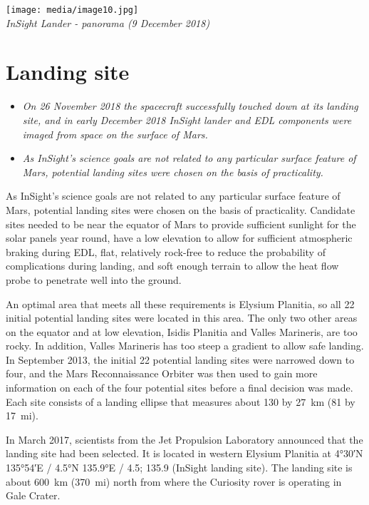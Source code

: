 \texttt{[image: media/image10.jpg]}\\
\emph{InSight Lander - panorama (9 December 2018)}

\section{Landing site}\label{landing-site}

\begin{itemize}
\item
  \emph{On 26 November 2018 the spacecraft successfully touched down at
  its landing site, and in early December 2018 InSight lander and EDL
  components were imaged from space on the surface of Mars.}
\item
  \emph{As InSight's science goals are not related to any particular
  surface feature of Mars, potential landing sites were chosen on the
  basis of practicality.}
\end{itemize}

As InSight's science goals are not related to any particular surface
feature of Mars, potential landing sites were chosen on the basis of
practicality. Candidate sites needed to be near the equator of Mars to
provide sufficient sunlight for the solar panels year round, have a low
elevation to allow for sufficient atmospheric braking during EDL, flat,
relatively rock-free to reduce the probability of complications during
landing, and soft enough terrain to allow the heat flow probe to
penetrate well into the ground.

An optimal area that meets all these requirements is Elysium Planitia,
so all 22 initial potential landing sites were located in this area. The
only two other areas on the equator and at low elevation, Isidis
Planitia and Valles Marineris, are too rocky. In addition, Valles
Marineris has too steep a gradient to allow safe landing.\\
In September 2013, the initial 22 potential landing sites were narrowed
down to four, and the Mars Reconnaissance Orbiter was then used to gain
more information on each of the four potential sites before a final
decision was made. Each site consists of a landing ellipse that measures
about 130 by 27~km (81 by 17~mi).

In March 2017, scientists from the Jet Propulsion Laboratory announced
that the landing site had been selected. It is located in western
Elysium Planitia at 4°30′N 135°54′E﻿ / ﻿4.5°N 135.9°E﻿ / 4.5; 135.9﻿
(InSight landing site). The landing site is about 600~km (370~mi) north
from where the Curiosity rover is operating in Gale Crater.


